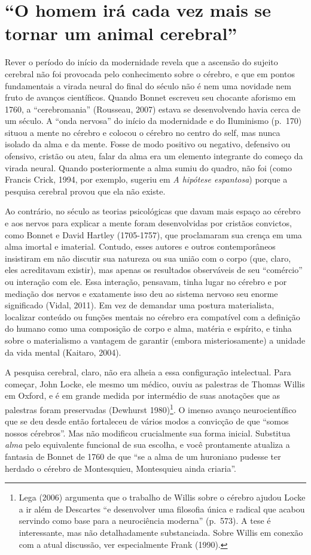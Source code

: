 \section{``O homem irá cada vez mais se tornar um animal cerebral''}

Rever o período do início da modernidade revela que a ascensão do
sujeito cerebral não foi provocada pelo conhecimento sobre o cérebro, e
que em pontos fundamentais a virada neural do final do século  não é
nem uma novidade nem fruto de avanços científicos. Quando Bonnet
escreveu seu chocante aforismo em 1760, a ``cerebromania'' (Rousseau,
2007) estava se desenvolvendo havia cerca de um século. A ``onda
nervosa'' do início da modernidade e do Iluminismo (p.~170) situou a
mente no cérebro e colocou o cérebro no centro do self, mas nunca
isolado da alma e da mente. Fosse de modo positivo ou negativo,
defensivo ou ofensivo, cristão ou ateu, falar da alma era um elemento
integrante do começo da virada neural. Quando posteriormente a alma
sumiu do quadro, não foi (como Francis Crick, 1994, por exemplo, sugeriu
em \emph{A hipótese espantosa}) porque a pesquisa cerebral provou que
ela não existe.

Ao contrário, no século  as teorias psicológicas que davam mais
espaço ao cérebro e aos nervos para explicar a mente foram desenvolvidas
por cristãos convictos, como Bonnet e David Hartley (1705-1757), que
proclamaram sua crença em uma alma imortal e imaterial. Contudo, esses
autores e outros contemporâneos insistiram em não discutir sua natureza
ou sua união com o corpo (que, claro, eles acreditavam existir), mas
apenas os resultados observáveis de seu ``comércio'' ou interação com
ele. Essa interação, pensavam, tinha lugar no cérebro e por mediação dos
nervos e exatamente isso deu ao sistema nervoso seu enorme significado
(Vidal, 2011). Em vez de demandar uma postura materialista, localizar
conteúdo ou funções mentais no cérebro era compatível com a definição do
humano como uma composição de corpo e alma, matéria e espírito, e tinha
sobre o materialismo a vantagem de garantir (embora misteriosamente) a
unidade da vida mental (Kaitaro, 2004).

A pesquisa cerebral, claro, não era alheia a essa configuração
intelectual. Para começar, John Locke, ele mesmo um médico, ouviu as
palestras de Thomas Willis em Oxford, e é em grande medida por
intermédio de suas anotações que as palestras foram preservadas
(Dewhurst 1980)\footnote[9]{Lega (2006) argumenta que o trabalho de Willis sobre o cérebro
ajudou Locke a ir além de Descartes ``e desenvolver uma filosofia única
e radical que acabou servindo como base para a neurociência moderna''
(p.~573). A tese é interessante, mas não detalhadamente substanciada.
Sobre Willis em conexão com a atual discussão, ver especialmente Frank
(1990).}. O imenso avanço neurocientífico que
se deu desde então fortaleceu de vários modos a convicção de que ``somos
nossos cérebros''. Mas não modificou crucialmente sua forma inicial.
Substitua \emph{alma} pelo equivalente funcional de sua escolha, e você
prontamente atualiza a fantasia de Bonnet de 1760 de que ``se a alma de
um huroniano pudesse ter herdado o cérebro de Montesquieu, Montesquieu
ainda criaria''.

